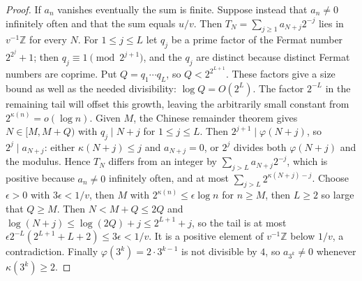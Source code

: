 \documentclass[11pt]{article}
\theoremstyle{plain}
\theoremstyle{definition}
\theoremstyle{remark}
\newcommand{\Z}{\mathbb{Z}}
\begin{document}
\begin{proof}
If $a_n$ vanishes eventually the sum is finite. Suppose instead that
$a_n\ne0$ infinitely often and that the sum equals $u/v$. Then
$T_N=\sum_{j\ge1}a_{N+j}2^{-j}$ lies in $v^{-1}\Z$ for every $N$. For
$1\le j\le L$ let $q_j$ be a prime factor of the Fermat number
$2^{2^j}+1$; then $q_j\equiv1\pmod{2^{j+1}}$, and the $q_j$ are distinct
because distinct Fermat numbers are coprime. Put $Q=q_1\cdots q_L$, so
$Q<2^{2^{L+1}}$. These factors give a size bound as well as the needed
divisibility: $\log Q=O(2^L)$. The factor $2^{-L}$ in the remaining
tail will offset this growth, leaving the arbitrarily small constant
from $2^{\kappa(n)}=o(\log n)$.
Given $M$, the Chinese remainder theorem gives
$N\in[M,M+Q)$ with $q_j\mid N+j$ for $1\le j\le L$. Then
$2^{j+1}\mid\varphi(N+j)$, so $2^j\mid a_{N+j}$: either
$\kappa(N+j)\le j$ and $a_{N+j}=0$, or $2^j$ divides both $\varphi(N+j)$
and the modulus. Hence $T_N$ differs from an integer by
$\sum_{j>L}a_{N+j}2^{-j}$, which is positive because $a_n\ne0$
infinitely often, and at most $\sum_{j>L}2^{\kappa(N+j)-j}$. Choose
$\epsilon>0$ with $3\epsilon<1/v$, then $M$ with
$2^{\kappa(n)}\le\epsilon\log n$ for $n\ge M$, then $L\ge2$ so large that
$Q\ge M$. Then $N<M+Q\le2Q$ and $\log(N+j)\le\log(2Q)+j\le2^{L+1}+j$, so
the tail is at most $\epsilon2^{-L}(2^{L+1}+L+2)\le3\epsilon<1/v$. It is a
positive element of $v^{-1}\Z$ below $1/v$, a contradiction. Finally $\varphi(3^k)=2\cdot3^{k-1}$ is not divisible by
$4$, so $a_{3^k}\ne0$ whenever $\kappa(3^k)\ge2$.
\end{proof}
\end{document}
